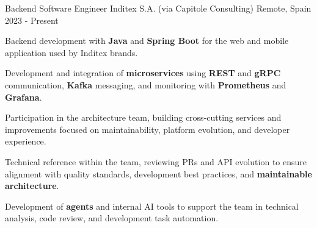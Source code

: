   \cventry
    {Backend Software Engineer}
    {Inditex S.A. \textnormal{(via Capitole Consulting)}}
  {Remote, Spain}
  {2023 - Present}
  {
    \begin{cvitems}
      \item {Backend development with \textbf{Java} and \textbf{Spring Boot} for the web and mobile application used by Inditex brands.}
      \item {Development and integration of \textbf{microservices} using \textbf{REST} and \textbf{gRPC} communication, \textbf{Kafka} messaging, and monitoring with \textbf{Prometheus} and \textbf{Grafana}.}
      \item {Participation in the architecture team, building cross-cutting services and improvements focused on maintainability, platform evolution, and developer experience.}
      \item {Technical reference within the team, reviewing PRs and API evolution to ensure alignment with quality standards, development best practices, and \textbf{maintainable architecture}.}
      \item {Development of \textbf{agents} and internal AI tools to support the team in technical analysis, code review, and development task automation.}
    \end{cvitems}
  }
